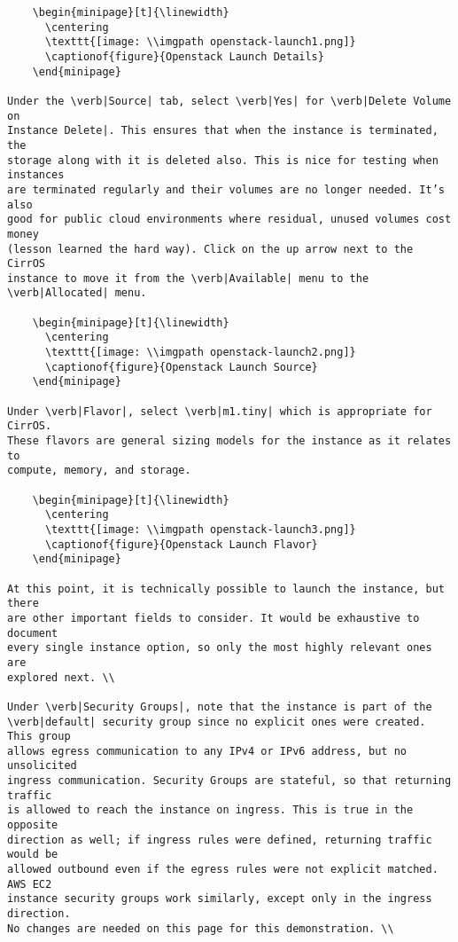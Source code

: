 \begin{verbatim}
    \begin{minipage}[t]{\linewidth}
	  \centering
      \texttt{[image: \\imgpath openstack-launch1.png]}
      \captionof{figure}{Openstack Launch Details}
    \end{minipage}

Under the \verb|Source| tab, select \verb|Yes| for \verb|Delete Volume on
Instance Delete|. This ensures that when the instance is terminated, the
storage along with it is deleted also. This is nice for testing when instances
are terminated regularly and their volumes are no longer needed. It’s also
good for public cloud environments where residual, unused volumes cost money
(lesson learned the hard way). Click on the up arrow next to the CirrOS
instance to move it from the \verb|Available| menu to the \verb|Allocated| menu.

    \begin{minipage}[t]{\linewidth}
	  \centering
      \texttt{[image: \\imgpath openstack-launch2.png]}
      \captionof{figure}{Openstack Launch Source}
    \end{minipage}

Under \verb|Flavor|, select \verb|m1.tiny| which is appropriate for CirrOS.
These flavors are general sizing models for the instance as it relates to
compute, memory, and storage.

    \begin{minipage}[t]{\linewidth}
	  \centering
      \texttt{[image: \\imgpath openstack-launch3.png]}
      \captionof{figure}{Openstack Launch Flavor}
    \end{minipage}

At this point, it is technically possible to launch the instance, but there
are other important fields to consider. It would be exhaustive to document
every single instance option, so only the most highly relevant ones are
explored next. \\

Under \verb|Security Groups|, note that the instance is part of the
\verb|default| security group since no explicit ones were created. This group
allows egress communication to any IPv4 or IPv6 address, but no unsolicited
ingress communication. Security Groups are stateful, so that returning traffic
is allowed to reach the instance on ingress. This is true in the opposite
direction as well; if ingress rules were defined, returning traffic would be
allowed outbound even if the egress rules were not explicit matched. AWS EC2
instance security groups work similarly, except only in the ingress direction.
No changes are needed on this page for this demonstration. \\


\end{verbatim}
